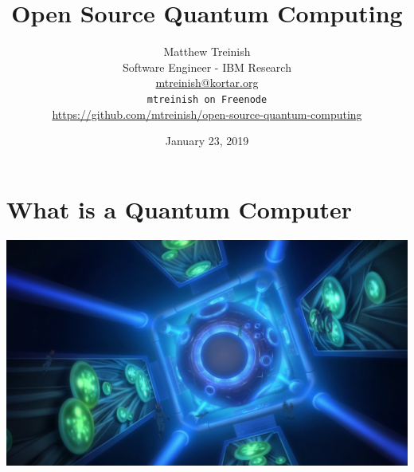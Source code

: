 \documentclass[aspectratio=169,11pt,hyperref={colorlinks=true}]{beamer}
\author[Matthew Treinish]{%
    \texorpdfstring{%
        \centering
        Matthew Treinish\\
        Software Engineer - IBM Research\\
        \href{mailto:mtreinish@kortar.org}{mtreinish@kortar.org}\\
        \texttt{mtreinish on Freenode}\\
        \href{https://github.com/mtreinish/open-source-quantum-computing}{https://github.com/mtreinish/open-source-quantum-computing}
   }
   {Matthew Treinish}
}
\date{January 23, 2019}
\title{Open Source Quantum Computing}
\begin{document}
\titlepage

\section{What is a Quantum Computer}
\begin{frame}
\end{frame}

\newcommand{\iu}{{i\mkern1mu}}

\begin{frame}
    \includegraphics[width=\textwidth]{Veda_AD2314.png}
\end{frame}
\end{document}
